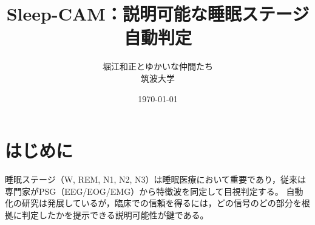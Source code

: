 \documentclass[twocolumn,11pt]{jsarticle}
\title{Sleep-CAM：説明可能な睡眠ステージ自動判定}
\author{堀江和正とゆかいな仲間たち\\筑波大学}
\date{\today}
\begin{document}
\maketitle

\section{はじめに}
睡眠ステージ（W, REM, N1, N2, N3）は睡眠医療において重要であり，従来は専門家がPSG（EEG/EOG/EMG）から特徴波を同定して目視判定する。
自動化の研究は発展しているが，臨床での信頼を得るには，どの信号のどの部分を根拠に判定したかを提示できる説明可能性が鍵である。
\end{document}
